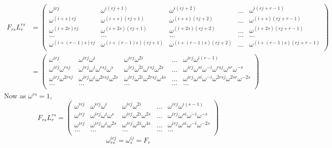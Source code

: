 \documentclass{article}
\begin{document}
	\begin{align}
		F_{rs}L^{rs}_r&=\begin{pmatrix}
			\omega^{irj} &  \omega^{i(rj+1)} & \omega^{i(rj+2)} & ... & \omega^{i(rj+r-1)} \\
			\omega^{(i+s)rj} &  \omega^{(i+s)(rj+1)} & \omega^{(i+s)(rj+2)} & ... & \omega^{(i+s)(rj+r-1)} \\
			\omega^{(i+2s)rj} &  \omega^{(i+2s)(rj+1)} & \omega^{(i+2s)(rj+2)} & ... & \omega^{(i+2s)(rj+r-1)} \\
			...& ...&...&...&...\\
			\omega^{(i+(r-1)s)rj} &  \omega^{(i+(r-1)s)(rj+1)} & \omega^{(i+(r-1)s)(rj+2)} & ... & \omega^{(i+(r-1)s)(rj+r-1)} \\
		\end{pmatrix}\\
	&=\begin{pmatrix}
		\omega^{irj} &  \omega^{irj}\omega^{i} & \omega^{irj}\omega^{2i} & ... & \omega^{irj}\omega^{i(r-1)} \\
		\omega^{irj}\omega^{rsj} &  \omega^{irj}\omega^i\omega^{rsj}\omega^s & \omega^{irj}\omega^{2i}\omega^{rsj}\omega^{2s} & ... & \omega^{irj}\omega^{si}\omega^{-i}\omega^{rsj}\omega^{sr}\omega^{-s} \\
		\omega^{irj}\omega^{2rsj} &  \omega^{irj}\omega^i\omega^{2rsj}\omega^{2s} & \omega^{irj}\omega^{2i}\omega^{2rsj}\omega^{4s} & ... & \omega^{irj}\omega^{si}\omega^{-i}\omega^{2rsj}\omega^{2sr}\omega^{-2s}\\
		...& ...&...&...&...\\
	\end{pmatrix}
	\end{align}
	Now as $\omega^{rs}=1$,
	\begin{equation}
		F_{rs}L^{rs}_r=\begin{pmatrix}
			\omega^{irj} &  \omega^{irj}\omega^{i} & \omega^{irj}\omega^{2i} & ... & \omega^{irj}\omega^{i(s-1)} \\
			\omega^{irj} &  \omega^{irj}\omega^i\omega^s & \omega^{irj}\omega^{2i}\omega^{2s} & ... & \omega^{irj}\omega^{si}\omega^{-i}\omega^{-s} \\
			\omega^{irj} &  \omega^{irj}\omega^i\omega^{2s} & \omega^{irj}\omega^{2i}\omega^{4s} & ... & \omega^{irj}\omega^{si}\omega^{-i}\omega^{-2s}\\
			...& ...&...&...&...\\
		\end{pmatrix}
	\end{equation}
	\begin{equation}
		\omega_{rs}^{irj}=\omega_{s}^{ij}=F_r
	\end{equation}
\end{document}
